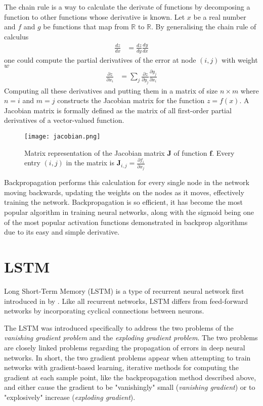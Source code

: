 \newcommand{\R}{\mathbb{R}}

The chain rule is a way to calculate the derivate of functions by decomposing a function to other functions whose derivative is known. Let $x$ be a real number and $f$ and $g$ be functions that map from $\R$ to $\R$. By generalising the chain rule of calculus
\begin{align}
    \frac{dz}{dx} &= \frac{dz}{dy}\frac{dy}{dx}
\end{align}
one could compute the partial derivatives of the error at node $ (i, j)$ with weight $w$ 
\begin{align}
    \frac{\partial z}{\partial x_i} &= \sum\limits_{j} \frac{\partial z}{\partial y_j}\frac{\partial y_j}{\partial x_i}
\end{align}
Computing all these derivatives and putting them in a matrix of size $n\times m$ where $n = i$ and $m = j$ constructs the Jacobian matrix for the function $z = f(x)$. A Jacobian matrix is formally defined as the matrix of all first-order partial derivatives of a vector-valued function.
\begin{figure}[H]
    \centering
    \texttt{[image: jacobian.png]}
    \label{tab:jacobian}
    \caption{Matrix representation of the Jacobian matrix $\mathbf{J}$ of function $\mathbf{f}$. Every entry $(i, j)$ in the matrix is $\mathbf{J}_{i, j} = \frac{\partial f_i}{\partial x_j}$}
\end{figure}
Backpropagation performs this calculation for every single node in the network moving backwards, updating the weights on the nodes as it moves, effectively training the network. Backpropagation is so efficient, it has become the most popular algorithm in training neural networks, along with the sigmoid being one of the most popular activation functions demonstrated in backprop algorithms due to its easy and simple derivative.

\section{LSTM}
Long Short-Term Memory (LSTM) is a type of recurrent neural network first introduced in \citeyear{lstm} by \citeauthor{lstm}. Like all recurrent networks, LSTM differs from feed-forward networks by incorporating cyclical connections between neurons.

The LSTM was introduced specifically to address the two problems of the \emph{vanishing gradient problem} and the \emph{exploding gradient problem}. The two problems are closely linked problems regarding the propagation of errors in deep neural networks. In short, the two gradient problems appear when attempting to train networks with gradient-based learning, iterative methods for computing the gradient at each sample point, like the backpropagation method described above, and either cause the gradient to be "vanishingly" small (\emph{vanishing gradient}) or to "explosively" increase (\emph{exploding gradient}).

